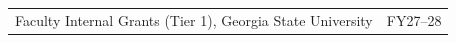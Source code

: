 \begin{center}
\renewcommand{\arraystretch}{1.5}%
\begin{tabular}{>{\raggedright}m{12cm}>{\raggedleft\arraybackslash}m{4.5cm}}
Faculty Internal Grants (Tier 1), Georgia State University & [PI] FY27--28\\
\end{tabular}
\end{center}

